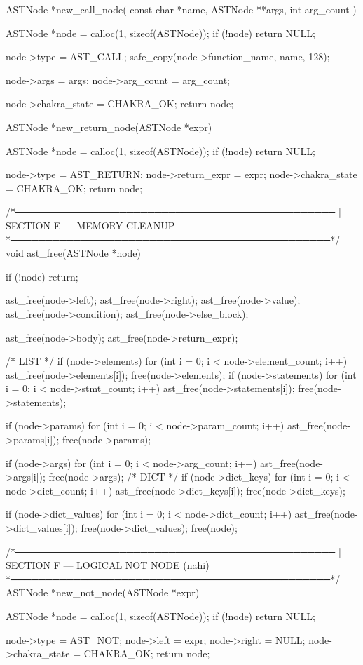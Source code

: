 \documentclass{article}
\begin{document}
ASTNode *new_call_node(
    const char *name,
    ASTNode **args,
    int arg_count
) {
    ASTNode *node = calloc(1, sizeof(ASTNode));
    if (!node) return NULL;

    node->type = AST_CALL;
    safe_copy(node->function_name, name, 128);

    node->args = args;
    node->arg_count = arg_count;

    node->chakra_state = CHAKRA_OK;
    return node;
}

ASTNode *new_return_node(ASTNode *expr)
{
    ASTNode *node = calloc(1, sizeof(ASTNode));
    if (!node) return NULL;

    node->type = AST_RETURN;
    node->return_expr = expr;
    node->chakra_state = CHAKRA_OK;
    return node;
}

/*──────────────────────────────────────────────
 | SECTION E — MEMORY CLEANUP
 *──────────────────────────────────────────────*/
void ast_free(ASTNode *node)
{
    if (!node) return;

    ast_free(node->left);
    ast_free(node->right);
    ast_free(node->value);
    ast_free(node->condition);
    ast_free(node->else_block);

    ast_free(node->body);
    ast_free(node->return_expr);

 /* LIST */
    if (node->elements) {
    for (int i = 0; i < node->element_count; i++) {
       ast_free(node->elements[i]);
    }
       free(node->elements);
    }
    if (node->statements) {
        for (int i = 0; i < node->stmt_count; i++)
            ast_free(node->statements[i]);
        free(node->statements);
    }

    if (node->params) {
        for (int i = 0; i < node->param_count; i++)
            ast_free(node->params[i]);
        free(node->params);
    }

    if (node->args) {
        for (int i = 0; i < node->arg_count; i++)
            ast_free(node->args[i]);
        free(node->args);
    }
/* DICT */
    if (node->dict_keys) {
        for (int i = 0; i < node->dict_count; i++) {
            ast_free(node->dict_keys[i]);
        }
        free(node->dict_keys);
    }

    if (node->dict_values) {
        for (int i = 0; i < node->dict_count; i++) {
            ast_free(node->dict_values[i]);
        }
        free(node->dict_values);
    }
    free(node);
}

/*──────────────────────────────────────────────
 | SECTION F — LOGICAL NOT NODE (nahi)
 *──────────────────────────────────────────────*/
ASTNode *new_not_node(ASTNode *expr)
{
    ASTNode *node = calloc(1, sizeof(ASTNode));
    if (!node) return NULL;

    node->type = AST_NOT;
    node->left = expr;
    node->right = NULL;
    node->chakra_state = CHAKRA_OK;
    return node;
}
\end{document}
